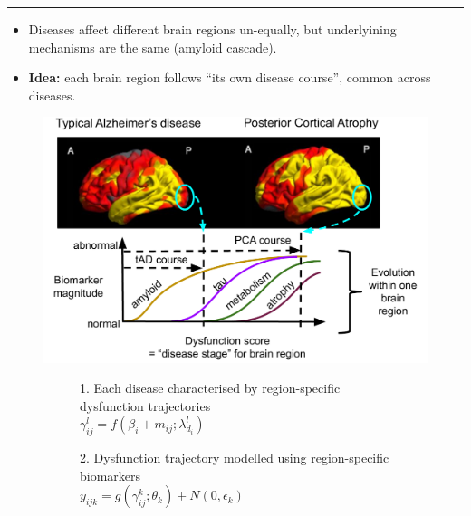 \documentclass[portrait,a0,final,20pt]{a0poster}
\newcommand{\fnt}[1]{\LARGE{#1}}
\begin{document}
{\begin{multicols}{2}
\end{multicols}
\hrule
\vspace{0.2em}

\begin{multicols}{2}							
\raggedcolumns	


\begin{itemize}
 \item Diseases affect different brain regions un-equally, but underlyining mechanisms are the same (amyloid cascade).
 \item \textbf{Idea:} each brain region follows ``its own disease course'', common across diseases.
\end{itemize}

\begin{figure}[H]

\includegraphics[width=\columnwidth]{DKT_intuition}
 
\end{figure}


 
\vspace{0.6em}
\begin{figure}[H]
 \centering
   \begin{subfigure}{0.49\columnwidth}
   \centering
   \fnt{1. Each disease characterised by region-specific dysfunction trajectories}\\
   $ \gamma_{ij}^l = f(\beta_{i} + m_{ij}; \lambda_{d_i}^l) $\\
   
  \end{subfigure}
  \begin{subfigure}{0.49\columnwidth}
   \centering
   \fnt{2. Dysfunction trajectory modelled using region-specific biomarkers}\\
   $ y_{ijk} = g( \gamma_{ij}^{k} ; \theta_k) + N(0,\epsilon_k) $
  \end{subfigure}


\end{figure}
\end{multicols}}
\end{document}
